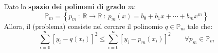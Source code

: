 \highspace
Dato lo \textbf{spazio dei polinomi di grado $m$}:
\begin{equation*}
	\mathbb{P}_{m} = \left\{p_{m} \: : \: \mathbb{R} \rightarrow \mathbb{R} \: : \: p_{m}\left(x\right) = b_{0} + b_{1}x + \cdots + b_{m}x^{m}\right\}
\end{equation*}
Allora, il (problema)  consiste nel cercare il polinomio $q \in \mathbb{P}_{m}$ tale che:
\begin{equation}\label{eq: metodo dei minimi quadrati}
	\displaystyle\sum_{i=0}^{n} \left[y_{i} - q\left(x_{i}\right)\right]^{2} \le \displaystyle\sum_{i=0}^{n} \left[y_{i} - p_{m}\left(x_{i}\right)\right]^{2} \hspace{2em} \forall p_{m} \in \mathbb{P}_{m}
\end{equation}

